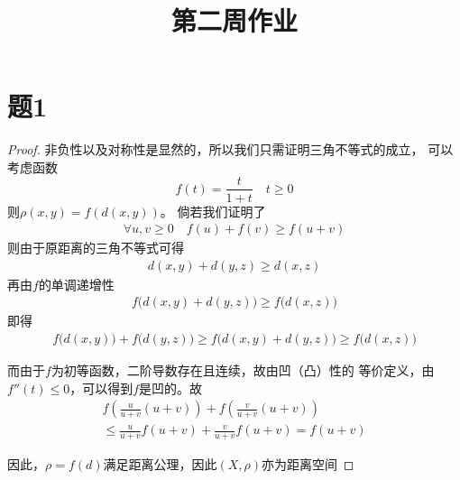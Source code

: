 \documentclass[cn]{homework}
\title{第二周作业}
\begin{document}
    \maketitle
    \section{题1}
    \begin{proof}
        非负性以及对称性是显然的，所以我们只需证明三角不等式的成立，
        可以考虑函数
        \[f(t)=\frac{t}{1+t}\quad t\geq 0\]
        则$\rho(x,y)=f(d(x,y))$。
        倘若我们证明了
        \begin{align*}
            \forall u,v\geq 0\quad
            f(u)+f(v)\geq f(u+v)
        \end{align*}
        则由于原距离的三角不等式可得
        \begin{align*}
            d(x,y)+d(y,z)\geq d(x,z)
        \end{align*}
        再由$f$的单调递增性
        \begin{align*}
            f\big(d(x,y)+d(y,z)\big)\geq f\big(d(x,z)\big)
        \end{align*}
        即得
        \begin{align*}
            f\big(d(x,y)\big)+f\big(d(y,z)\big)
            \geq f\big(d(x,y)+d(y,z)\big)
            \geq f\big(d(x,z)\big)
        \end{align*}

        而由于$f$为初等函数，二阶导数存在且连续，故由凹（凸）性的
        等价定义，由$f''(t)\leq 0$，可以得到$f$是凹的。故
        \begin{multline*}
            f\left(\frac{u}{u+v}(u+v)\right)+f\left(\frac{v}{u+v}(u+v)\right)\\
            \leq\frac{u}{u+v}f(u+v)+\frac{v}{u+v}f(u+v)
            =f(u+v)
        \end{multline*}
        
        因此，$\rho=f(d)$满足距离公理，因此$(X,\rho)$亦为距离空间
    \end{proof}
\end{document}
